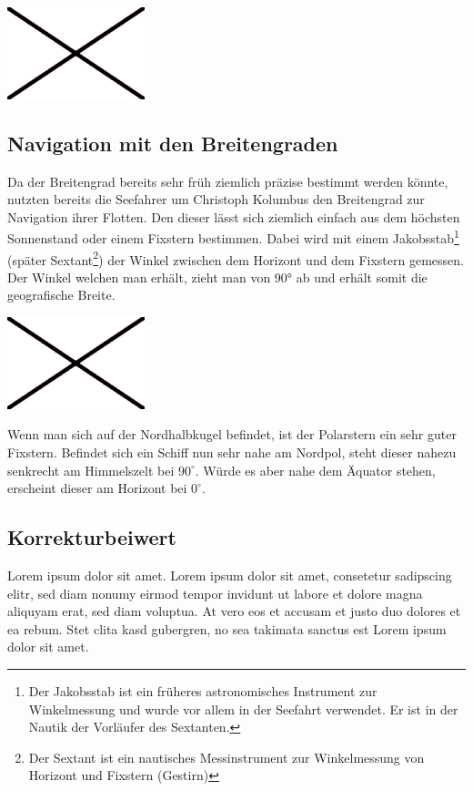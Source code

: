 \begin{refsection}
\begin{center}
        \includegraphics[width=0.3\textwidth]{kugel/Beispielbild.jpg}
\end{center}


\subsection{Navigation mit den Breitengraden}
Da der Breitengrad bereits sehr früh ziemlich präzise bestimmt werden könnte, nutzten bereits die Seefahrer um Christoph Kolumbus den Breitengrad zur Navigation ihrer Flotten.
Den dieser lässt sich ziemlich einfach aus dem höchsten Sonnenstand oder einem Fixstern bestimmen. Dabei wird mit einem Jakobsstab\footnote{%
Der Jakobsstab ist ein früheres astronomisches Instrument zur Winkelmessung und wurde vor allem in der Seefahrt verwendet. Er ist in der Nautik der Vorläufer des Sextanten.} (später Sextant\footnote{%
Der Sextant ist ein nautisches Messinstrument zur Winkelmessung von Horizont und Fixstern (Gestirn)}) der Winkel zwischen dem Horizont und dem Fixstern gemessen. Der Winkel welchen man erhält, zieht man von 90° ab und erhält somit die geografische Breite. \\

\begin{center}
        \includegraphics[width=0.3\textwidth]{kugel/Beispielbild.jpg}
\end{center}

Wenn man sich auf der Nordhalbkugel befindet, ist der Polarstern ein sehr guter Fixstern. Befindet sich ein Schiff nun sehr nahe am Nordpol, steht dieser nahezu senkrecht am Himmelszelt bei $90^{\circ}$. Würde es aber nahe dem Äquator stehen, erscheint dieser am Horizont bei $0^{\circ}$.

\subsection{Korrekturbeiwert}
Lorem ipsum dolor sit amet. Lorem ipsum dolor sit amet, consetetur sadipscing elitr, sed diam nonumy eirmod tempor invidunt ut labore et dolore magna aliquyam erat, sed diam voluptua. At vero eos et accusam et justo duo dolores et ea rebum. Stet clita kasd gubergren, no sea takimata sanctus est Lorem ipsum dolor sit amet.



\end{refsection}
